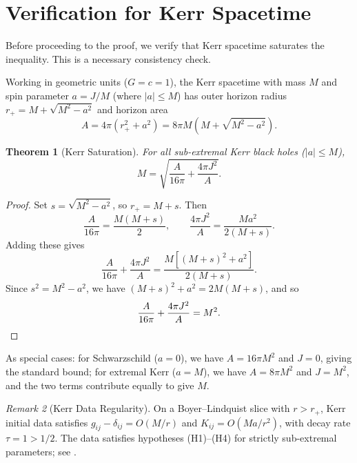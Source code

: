 \documentclass[12pt]{article}
\theoremstyle{plain}
\newtheorem{theorem}{Theorem}[section]
\theoremstyle{definition}
\theoremstyle{remark}
\newtheorem{remark}[theorem]{Remark}
\begin{document}

\section{Verification for Kerr Spacetime}\label{sec:kerr}

Before proceeding to the proof, we verify that Kerr spacetime saturates the inequality. This is a necessary consistency check.

Working in geometric units ($G=c=1$), the Kerr spacetime with mass $M$ and spin parameter $a = J/M$ (where $|a| \leq M$) has outer horizon radius $r_+ = M + \sqrt{M^2 - a^2}$ and horizon area
\[
A = 4\pi(r_+^2 + a^2) = 8\pi M(M + \sqrt{M^2 - a^2}).
\]

\begin{theorem}[Kerr Saturation]\label{thm:kerr}
For all sub-extremal Kerr black holes ($|a| \leq M$),
\[
M = \sqrt{\frac{A}{16\pi} + \frac{4\pi J^2}{A}}.
\]
\end{theorem}

\begin{proof}
Set $s = \sqrt{M^2 - a^2}$, so $r_+ = M + s$. Then
\[
\frac{A}{16\pi} = \frac{M(M + s)}{2}, \qquad \frac{4\pi J^2}{A} = \frac{Ma^2}{2(M + s)}.
\]
Adding these gives
\[
\frac{A}{16\pi} + \frac{4\pi J^2}{A} = \frac{M[(M + s)^2 + a^2]}{2(M + s)}.
\]
Since $s^2 = M^2 - a^2$, we have $(M + s)^2 + a^2 = 2M(M + s)$, and so
\[
\frac{A}{16\pi} + \frac{4\pi J^2}{A} = M^2. \qedhere
\]
\end{proof}

As special cases: for Schwarzschild ($a = 0$), we have $A = 16\pi M^2$ and $J = 0$, giving the standard bound; for extremal Kerr ($a = M$), we have $A = 8\pi M^2$ and $J = M^2$, and the two terms contribute equally to give $M$.

\begin{remark}[Kerr Data Regularity]\label{rem:kerr-regularity}
On a Boyer--Lindquist slice with $r > r_+$, Kerr initial data satisfies $g_{ij} - \delta_{ij} = O(M/r)$ and $K_{ij} = O(Ma/r^2)$, with decay rate $\tau = 1 > 1/2$. The data satisfies hypotheses (H1)--(H4) for strictly sub-extremal parameters; see \cite{ChruscielCostaHeusler2012}.
\end{remark}

\end{document}
